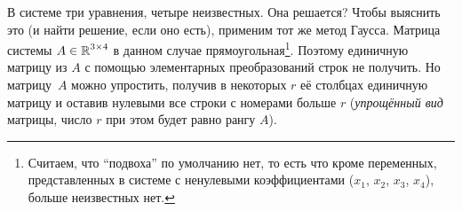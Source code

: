 \documentclass[a4paper,12pt]{article}
\begin{document}
  В системе три уравнения, четыре неизвестных.
  Она решается?
  Чтобы выяснить это (и найти решение, если оно есть), применим тот же метод Гаусса.
  Матрица системы $A \hm\in \RR^{3\times 4}$ в данном случае прямоугольная\footnote{Считаем, что ``подвоха'' по умолчанию нет, то есть что кроме переменных, представленных в системе с ненулевыми коэффициентами ($x_1$, $x_2$, $x_3$, $x_4$), больше неизвестных нет.}.
  Поэтому единичную матрицу из $A$ с помощью элементарных преобразований строк не получить.
  Но матрицу~$A$ можно упростить, получив в некоторых $r$ её столбцах единичную матрицу и оставив нулевыми все строки с номерами больше $r$ (\emph{упрощённый вид} матрицы, число $r$ при этом будет равно рангу $A$).
\end{document}
